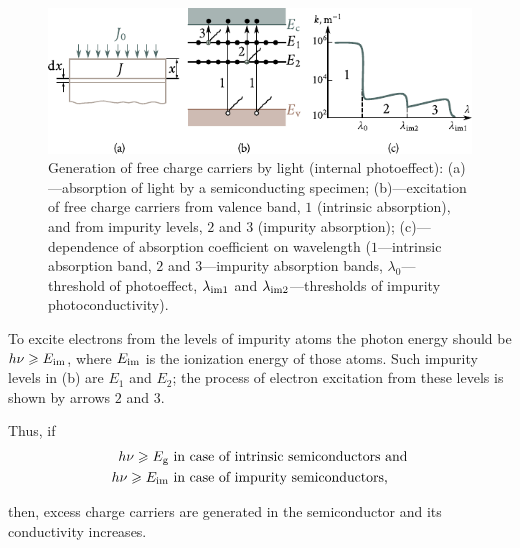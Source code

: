 \begin{figure}[t]
	\begin{center}
		\includegraphics[scale=1.1]{figures/ch_06/fig_6_18.pdf}
		\caption[]{Generation of free charge carriers by light (internal photoeffect): (a)---absorption of light by a semiconducting specimen; (b)---excitation of free charge carriers from valence band, $1$ (intrinsic absorption), and from impurity levels, $2$ and $3$ (impurity absorption); (c)---dependence of absorption coefficient on wavelength ($1$---intrinsic absorption band, $2$ and $3$---impurity absorption bands, $\lambda_0$---threshold of photoeffect, $\lambda_{\text{im$1$}}$ and $\lambda_{\text{im$2$}}$---thresholds of impurity photoconductivity).}
		\label{fig:6_18}
	\end{center}
	\vspace{-0.7cm}
\end{figure}

To excite electrons from the levels of impurity atoms the photon energy should be $h\nu\geqslant E_{\text{im}}$, where $E_{\text{im}}$ is the ionization energy of those atoms. Such impurity levels in (b) are $E_1$ and $E_2$; the process of electron excitation from these levels is shown by arrows $2$ and $3$.

Thus, if
\begin{equation}\label{eq:6_44}
	\begin{split}
		h\nu\geqslant E_{\text{g}}\,\, &\text{in case of intrinsic semiconductors and}\\
		h\nu\geqslant E_{\text{im}}\,\, &\text{in case of impurity semiconductors,}
	\end{split}
\end{equation}

\noindent
then, excess charge carriers are generated in the semiconductor and its conductivity increases.


